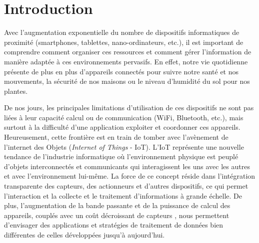 

\begin{resume}
	
\end{resume}

\section{Introduction}

Avec l'augmentation exponentielle du nombre de dispositifs informatiques de proximité (smartphones, tablettes, nano-ordinateurs, etc.),  il est important de comprendre comment organiser ces ressources et comment gérer l'information de manière adaptée à ces environnements pervasifs. 
En effet, notre vie quotidienne présente de plus en plus d'appareils connectés pour suivre notre santé et nos mouvements, la sécurité de nos maisons ou le niveau d'humidité du sol pour nos plantes. 

De nos jours, les principales limitations d'utilisation de ces dispositifs ne sont pas liées à leur capacité calcul ou de communication (WiFi, Bluetooth, etc.), mais surtout à la difficulté d'une application exploiter et coordonner ces appareils. Heureusement, cette frontière est en train de tomber avec l'avènement de l'internet des Objets (\textit{Internet of Things} - IoT). L'IoT représente une nouvelle tendance de l'industrie informatique où l'environnement physique est peuplé d'objets interconnectés et communicants qui interagissent les uns avec les autres et avec l'environnement lui-même. La force de ce concept réside dans l'intégration transparente des capteurs, des actionneurs et d'autres dispositifs, ce qui permet l'interaction et la collecte et le traitement d'informations à grande échelle. De plus, l'augmentation de la bande passante et de la puissance de calcul des appareils, couplés avec un coût décroissant de capteurs \cite{Jones2014}, nous permettent d'envisager des applications et stratégies de traitement de données bien différentes de celles développées jusqu'à aujourd'hui.


